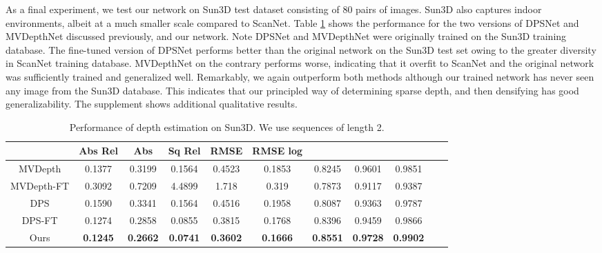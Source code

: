 \documentclass[runningheads]{llncs}
\begin{document}
As a final experiment, we test our network on Sun3D test dataset consisting of 80 pairs of images. Sun3D also captures indoor environments, albeit at a much smaller scale compared to ScanNet. Table \ref{sun3d} shows the performance for the two versions of DPSNet and MVDepthNet discussed previously, and our network. Note DPSNet and MVDepthNet were originally trained on the Sun3D training database. The fine-tuned version of DPSNet performs better than the original network on the Sun3D test set owing to the greater diversity in ScanNet training database. MVDepthNet on the contrary performs worse, indicating that it overfit to ScanNet and the original network was sufficiently trained and generalized well. Remarkably, we again outperform both methods although our trained network has never seen any image from the Sun3D database. This indicates that our principled way of determining sparse depth, and then densifying has good generalizability. The supplement shows additional qualitative results. 
\begin{table}[t]
  \caption{Performance of depth estimation on Sun3D. We use sequences of length 2.}
  \centering
\begin{tabular}{ccccccccccc}
    \hline
     &Abs Rel  &Abs & Sq Rel & RMSE & RMSE log & \textbf{}& \textbf{}& \textbf{}\\
    \hline
    MVDepth & 0.1377  &  0.3199 & 0.1564 & 0.4523 & 0.1853 & 0.8245 & 0.9601 & 0.9851  \\
    MVDepth-FT & 0.3092 & 0.7209 & 4.4899 & 1.718 & 0.319 & 0.7873 & 0.9117 & 0.9387  \\
    DPS & 0.1590 & 0.3341 & 0.1564 & 0.4516 & 0.1958& 0.8087 & 0.9363 & 0.9787		 \\
    DPS-FT &	0.1274 & 0.2858 & 0.0855 & 0.3815 & 0.1768 & 0.8396 & 0.9459 & 0.9866	\\
    Ours &	\textbf{0.1245} & \textbf{0.2662} & \textbf{0.0741}  & \textbf{0.3602} & \textbf{0.1666}& \textbf{0.8551} & \textbf{0.9728} & \textbf{0.9902} \\
    \hline
  \end{tabular}
  \label{sun3d}
\end{table}
\end{document}

